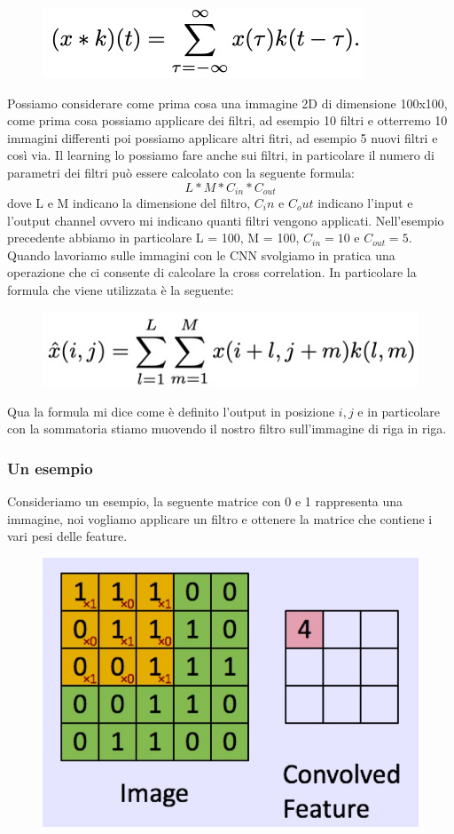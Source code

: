 \documentclass[14pt]{extreport}
\begin{document}
\begin{figure}[H]
\centering
\includegraphics[width=0.7\linewidth]{403.jpeg}
\end{figure}

Possiamo considerare come prima cosa una immagine 2D di dimensione 100x100, come prima cosa possiamo applicare dei filtri, ad esempio 10 filtri e
otterremo 10 immagini differenti poi possiamo applicare altri fitri, ad esempio 5 nuovi filtri e così via. Il learning lo possiamo fare anche sui
filtri, in particolare il numero di parametri dei filtri può essere calcolato con la seguente formula: $$L*M*C_{in}*C_{out}$$ dove L e M indicano la
dimensione del filtro, $C_in$ e $C_out$ indicano l'input e l'output channel ovvero mi indicano quanti filtri vengono applicati. Nell'esempio
precedente abbiamo in particolare L = 100, M = 100, $C_{in} = 10$ e $C_{out} = 5$. Quando lavoriamo sulle immagini con le CNN svolgiamo in pratica una
operazione che ci consente di calcolare la cross correlation. In particolare la formula che viene utilizzata è la seguente:

\begin{figure}[H]
\centering
\includegraphics[width=0.7\linewidth]{405.jpeg}
\end{figure}

Qua la formula mi dice come è definito l'output in posizione $i,j$ e in particolare con la sommatoria stiamo muovendo il nostro filtro sull'immagine
di riga in riga.

\subsubsection{Un esempio}

Consideriamo un esempio, la seguente matrice con 0 e 1 rappresenta una immagine, noi vogliamo applicare un filtro e ottenere la matrice che contiene i
vari pesi delle feature.

\begin{figure}[H]
\centering
\includegraphics[width=0.7\linewidth]{406.jpeg}
\end{figure}
\end{document}
